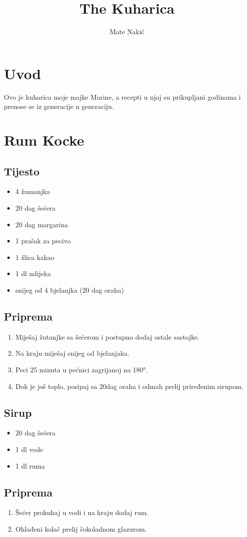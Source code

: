\documentclass{article}
\title{The Kuharica}
\author{Mate Nakić}
\begin{document}
\maketitle

\newpage

\section{Uvod}
Ovo je kuharica moje majke Marine, a recepti u njoj su prikupljani godinama
i prenose se iz generacije u generaciju.

\section{Rum Kocke}
\subsection{Tijesto}
\begin{itemize}
  \item 4 žumanjka
  \item 20 dag šećera
  \item 20 dag margarina
  \item 1 prašak za pecivo
  \item 1 žlica kakao
  \item 1 dl mlijeka
  \item snijeg od 4 bjelanjka (20 dag oraha)
\end{itemize}
\subsection{Priprema}
\begin{enumerate}
  \item Miješaj žutanjke sa šećerom i postupno dodaj ostale sastojke.
  \item Na kraju miješaj snijeg od bjelanjaka.
  \item Peci 25 minuta u pećnici zagrijanoj na 180°.
  \item Dok je još toplo, posipaj sa 20dag oraha i odmah prelij priređenim sirupom.
\end{enumerate}

\subsection{Sirup}
\begin{itemize}
  \item 20 dag šećera
  \item 1 dl vode
  \item 1 dl ruma
\end{itemize}

\subsection{Priprema}
\begin{enumerate}
  \item Šećer prokuhaj u vodi i na kraju dodaj rum.
  \item Ohlađeni kolač prelij čokoladnom glazurom.
\end{enumerate}
\end{document}

